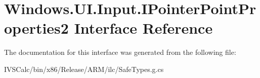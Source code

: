 \hypertarget{interface_windows_1_1_u_i_1_1_input_1_1_i_pointer_point_properties2}{}\section{Windows.\+U\+I.\+Input.\+I\+Pointer\+Point\+Properties2 Interface Reference}
\label{interface_windows_1_1_u_i_1_1_input_1_1_i_pointer_point_properties2}


The documentation for this interface was generated from the following file\+:\begin{DoxyCompactItemize}
\item 
I\+V\+S\+Calc/bin/x86/\+Release/\+A\+R\+M/ilc/Safe\+Types.\+g.\+cs\end{DoxyCompactItemize}
